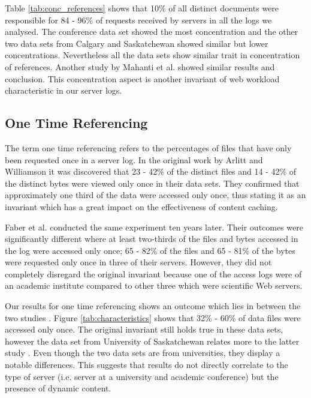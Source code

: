 \documentclass[10pt,conference]{IEEEtran}
\begin{document}
Table \ref{tab:conc_references} shows that 10\% of all distinct documents were responsible for 84 - 96\% of requests received by servers in all the logs we analysed. The conference data set showed the most concentration and the other two data sets from Calgary and Saskatchewan showed similar but lower concentrations. Nevertheless all the data sets show similar trait in concentration of references. Another study by Mahanti et al.\cite{Mahanti} showed similar results and conclusion. This concentration aspect is another invariant of web workload characteristic in our server logs.

\subsection{One Time Referencing} %
\label{sub:one_time_referencing}
The term one time referencing refers to the percentages of files that have only been requested once in a server log. In the original work by Arlitt and Williamson \cite{invariants} it was discovered that 23 - 42\% of the distinct files and 14 - 42\% of the distinct bytes were viewed only once in their data sets. They confirmed that approximately one third of the data were accessed only once, thus stating it as an invariant which has a great impact on the effectiveness of content caching.

Faber et al. \cite{Faber} conducted the same experiment ten years later. Their outcomes were significantly different where at least two-thirds of the files and bytes accessed in the log were accessed only once; 65 - 82\% of the files and 65 - 81\% of the bytes were requested only once in three of their servers. However, they did not completely disregard the original invariant because one of the access logs were of an academic institute compared to other three which were scientific Web servers.

Our results for one time referencing shows an outcome which lies in between the two studies \cite{invariants, Faber}. Figure \ref{tab:characteristics} shows that 32\% - 60\% of data files were accessed only once. The original invariant still holds true in these data sets, however the data set from University of Saskatchewan relates more to the latter study \cite{Faber}. Even though the two data sets are from universities, they display a notable differences. This suggests that results do not directly correlate to the type of server (i.e. server at a university and academic conference) but the presence of dynamic content.
\end{document}
